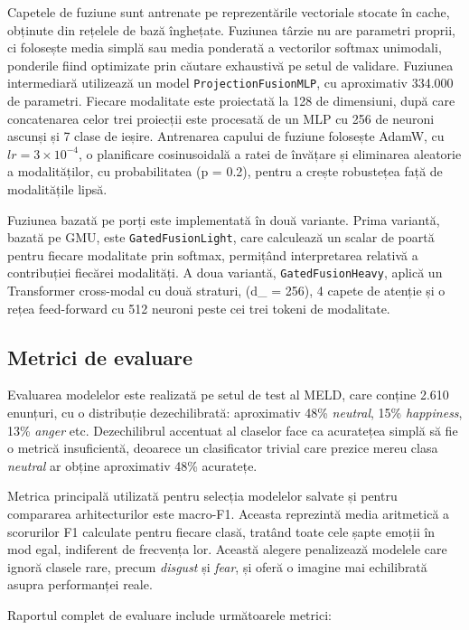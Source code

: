 \documentclass[12pt, a4paper]{article}
\begin{document}
Capetele de fuziune sunt antrenate pe reprezentările vectoriale stocate în cache, obținute din rețelele de bază înghețate. Fuziunea târzie nu are parametri proprii, ci folosește media simplă sau media ponderată a vectorilor softmax unimodali, ponderile fiind optimizate prin căutare exhaustivă pe setul de validare. Fuziunea intermediară utilizează un model \texttt{ProjectionFusionMLP}, cu aproximativ 334.000 de parametri. Fiecare modalitate este proiectată la 128 de dimensiuni, după care concatenarea celor trei proiecții este procesată de un MLP cu 256 de neuroni ascunși și 7 clase de ieșire. Antrenarea capului de fuziune folosește AdamW, cu \(lr = 3 \times 10^{-4}\), o planificare cosinusoidală a ratei de învățare și eliminarea aleatorie a modalităților, cu probabilitatea (p = 0.2), pentru a crește robustețea față de modalitățile lipsă.

Fuziunea bazată pe porți este implementată în două variante. Prima variantă, bazată pe GMU, este \texttt{GatedFusionLight}, care calculează un scalar de poartă pentru fiecare modalitate prin softmax, permițând interpretarea relativă a contribuției fiecărei modalități. A doua variantă, \texttt{GatedFusionHeavy}, aplică un Transformer cross-modal cu două straturi, (d\_{} = 256), 4 capete de atenție și o rețea feed-forward cu 512 neuroni peste cei trei tokeni de modalitate.


\subsection{Metrici de evaluare}

Evaluarea modelelor este realizată pe setul de test al MELD, care conține 2.610 enunțuri, cu o distribuție dezechilibrată: aproximativ 48\% \textit{neutral}, 15\% \textit{happiness}, 13\% \textit{anger} etc. Dezechilibrul accentuat al claselor face ca acuratețea simplă să fie o metrică insuficientă, deoarece un clasificator trivial care prezice mereu clasa \textit{neutral} ar obține aproximativ 48\% acuratețe.

Metrica principală utilizată pentru selecția modelelor salvate și pentru compararea arhitecturilor este macro-F1. Aceasta reprezintă media aritmetică a scorurilor F1 calculate pentru fiecare clasă, tratând toate cele șapte emoții în mod egal, indiferent de frecvența lor. Această alegere penalizează modelele care ignoră clasele rare, precum \textit{disgust} și \textit{fear}, și oferă o imagine mai echilibrată asupra performanței reale.

Raportul complet de evaluare include următoarele metrici:
\end{document}
